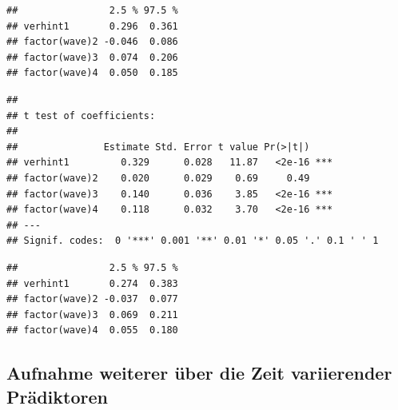 \documentclass[
]{book}
\newenvironment{Shaded}{\begin{snugshade}}{\end{snugshade}}
\newcommand{\CommentTok}[1]{\textcolor[rgb]{0.56,0.35,0.01}{\textit{#1}}}
\newcommand{\DataTypeTok}[1]{\textcolor[rgb]{0.13,0.29,0.53}{#1}}
\newcommand{\DecValTok}[1]{\textcolor[rgb]{0.00,0.00,0.81}{#1}}
\newcommand{\KeywordTok}[1]{\textcolor[rgb]{0.13,0.29,0.53}{\textbf{#1}}}
\newcommand{\NormalTok}[1]{#1}
\newcommand{\OperatorTok}[1]{\textcolor[rgb]{0.81,0.36,0.00}{\textbf{#1}}}
\newcommand{\StringTok}[1]{\textcolor[rgb]{0.31,0.60,0.02}{#1}}
\begin{document}
\begin{verbatim}
##                2.5 % 97.5 %
## verhint1       0.296  0.361
## factor(wave)2 -0.046  0.086
## factor(wave)3  0.074  0.206
## factor(wave)4  0.050  0.185
\end{verbatim}

\begin{Shaded}
\end{Shaded}

\begin{verbatim}
## 
## t test of coefficients:
## 
##               Estimate Std. Error t value Pr(>|t|)    
## verhint1         0.329      0.028   11.87   <2e-16 ***
## factor(wave)2    0.020      0.029    0.69     0.49    
## factor(wave)3    0.140      0.036    3.85   <2e-16 ***
## factor(wave)4    0.118      0.032    3.70   <2e-16 ***
## ---
## Signif. codes:  0 '***' 0.001 '**' 0.01 '*' 0.05 '.' 0.1 ' ' 1
\end{verbatim}

\begin{Shaded}
\end{Shaded}

\begin{verbatim}
##                2.5 % 97.5 %
## verhint1       0.274  0.383
## factor(wave)2 -0.037  0.077
## factor(wave)3  0.069  0.211
## factor(wave)4  0.055  0.180
\end{verbatim}

\hypertarget{aufnahme-weiterer-uxfcber-die-zeit-variierender-pruxe4diktoren}{%
\subsection*{Aufnahme weiterer über die Zeit variierender Prädiktoren}\label{aufnahme-weiterer-uxfcber-die-zeit-variierender-pruxe4diktoren}}
\end{document}

